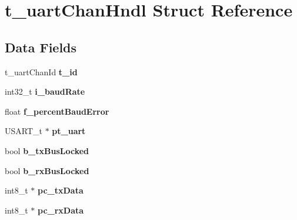 \hypertarget{structt__uart_chan_hndl}{\section{t\-\_\-uart\-Chan\-Hndl Struct Reference}
\label{structt__uart_chan_hndl}
}
\subsection*{Data Fields}
\begin{DoxyCompactItemize}
\item 
\hypertarget{structt__uart_chan_hndl_ab5c1d5bc883e27f04ee803d17c78a612}{t\-\_\-uart\-Chan\-Id {\bfseries t\-\_\-id}}\label{structt__uart_chan_hndl_ab5c1d5bc883e27f04ee803d17c78a612}

\item 
\hypertarget{structt__uart_chan_hndl_a6616035bfad2a509244b7fc44e8604b5}{int32\-\_\-t {\bfseries i\-\_\-baud\-Rate}}\label{structt__uart_chan_hndl_a6616035bfad2a509244b7fc44e8604b5}

\item 
\hypertarget{structt__uart_chan_hndl_a92712f9c89403f80f6ae5a97cb25b783}{float {\bfseries f\-\_\-percent\-Baud\-Error}}\label{structt__uart_chan_hndl_a92712f9c89403f80f6ae5a97cb25b783}

\item 
\hypertarget{structt__uart_chan_hndl_a24f717d07b9bf73b362284bda243e956}{U\-S\-A\-R\-T\-\_\-t $\ast$ {\bfseries pt\-\_\-uart}}\label{structt__uart_chan_hndl_a24f717d07b9bf73b362284bda243e956}

\item 
\hypertarget{structt__uart_chan_hndl_ad672b1ed7af5eac996651c1bda7ee703}{bool {\bfseries b\-\_\-tx\-Bus\-Locked}}\label{structt__uart_chan_hndl_ad672b1ed7af5eac996651c1bda7ee703}

\item 
\hypertarget{structt__uart_chan_hndl_a7e56800e417e535bee7ef7bf8e33274f}{bool {\bfseries b\-\_\-rx\-Bus\-Locked}}\label{structt__uart_chan_hndl_a7e56800e417e535bee7ef7bf8e33274f}

\item 
\hypertarget{structt__uart_chan_hndl_a0053cb84281e32d32f7979eccbf0d9e3}{int8\-\_\-t $\ast$ {\bfseries pc\-\_\-tx\-Data}}\label{structt__uart_chan_hndl_a0053cb84281e32d32f7979eccbf0d9e3}

\item 
\hypertarget{structt__uart_chan_hndl_afe2570c4be33989ddef366f82133df35}{int8\-\_\-t $\ast$ {\bfseries pc\-\_\-rx\-Data}}\label{structt__uart_chan_hndl_afe2570c4be33989ddef366f82133df35}


\end{DoxyCompactItemize}
